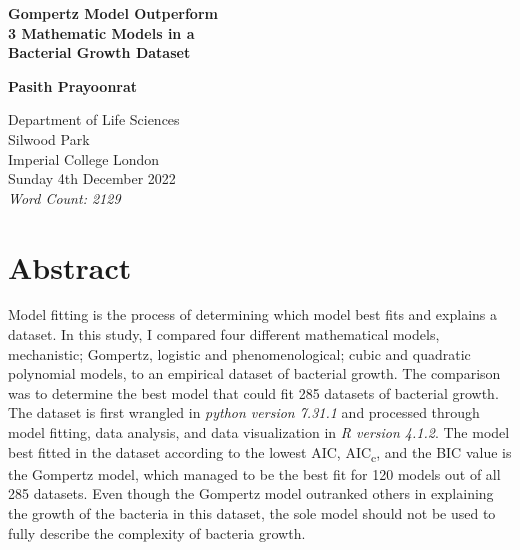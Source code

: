 \documentclass[11pt]{article}
\begin{document}
\begin{titlepage}
	\begin{center}
		\vspace*{1cm}
		
		\begin{Large}
			\textbf{Gompertz Model Outperform\\
       3 Mathematic Models in a\\
       Bacterial Growth Dataset\\}
		\end{Large}
		
		
		\vspace{1.5cm}
		
		\textbf{Pasith Prayoonrat}
		
		\vfill
		
		Department of Life Sciences\\
		Silwood Park\\
		Imperial College London\\
		Sunday 4th December 2022\\
    \textit{Word Count: 2129}
		\vspace{\baselineskip}
		\vfill
		
	\end{center}
\end{titlepage}

\newpage 

  \section{Abstract}
\noindent Model fitting is the process of determining which model best fits and explains a dataset. 
  In this study, I compared four different mathematical models, mechanistic; Gompertz, logistic and phenomenological; cubic and quadratic polynomial models, to an empirical dataset of bacterial growth.
  The comparison was to determine the best model that could fit 285 datasets of bacterial growth.
  The dataset is first wrangled in \textit{python version 7.31.1} and processed through model fitting, data analysis, and data visualization in \textit{R version 4.1.2}.
  The model best fitted in the dataset according to the lowest AIC, AIC\textsubscript{c}, and the BIC value is the Gompertz model, which managed to be the best fit for 120 models out of all 285 datasets.
  Even though the Gompertz model outranked others in explaining the growth of the bacteria in this dataset, the sole model should not be used to fully describe the complexity of bacteria growth.
  \pagebreak
  \pagebreak
\end{document}
